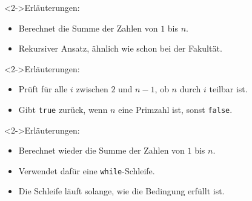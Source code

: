 \begin{fframe}
    \begin{block}<2->{Erläuterungen:}
        \begin{itemize}
            \item Berechnet die Summe der Zahlen von $1$ bis $n$.
            \item Rekursiver Ansatz, ähnlich wie schon bei der Fakultät.
        \end{itemize}
    \end{block}
\end{fframe}

\begin{fframe}
    \begin{block}<2->{Erläuterungen:}
        \begin{itemize}
            \item Prüft für alle $i$ zwischen $2$ und $n-1$, ob $n$ durch $i$ teilbar ist.
            \item Gibt \texttt{true} zurück, wenn $n$ eine Primzahl ist, sonst \texttt{false}.
        \end{itemize}
    \end{block}
\end{fframe}

\begin{fframe}
    \begin{block}<2->{Erläuterungen:}
        \begin{itemize}
            \item Berechnet wieder die Summe der Zahlen von $1$ bis $n$.
            \item Verwendet dafür eine \alert{\texttt{while}-Schleife}.
            \item Die Schleife läuft solange, wie die Bedingung erfüllt ist.
        \end{itemize}
    \end{block}
\end{fframe}
